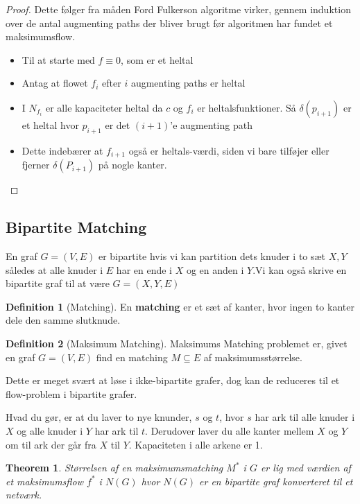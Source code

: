 \documentclass[11pt]{article}
\newtheorem{theorem}{Theorem}
\theoremstyle{definition}
\newtheorem{definition}{Definition}
\theoremstyle{remark}
\begin{document}
\begin{proof}
Dette følger fra måden Ford Fulkerson algoritme virker, gennem induktion over de antal augmenting paths der bliver brugt før algoritmen har fundet et maksimumsflow.

\begin{itemize}
\item Til at starte med $f \equiv 0$, som er et heltal
\item Antag at flowet $f_{i}$ efter $i$ augmenting paths er heltal
\item I $N_{f_{i}}$ er alle kapaciteter heltal da $c$ og $f_{i}$ er heltalsfunktioner. Så $\delta(p_{i+1})$ er et heltal hvor $p_{i+1}$ er det $(i+1)$'e augmenting path
\item Dette indebærer at $f_{i+1}$ også er heltals-værdi, siden vi bare tilføjer eller fjerner $\delta(P_{i+1})$ på nogle kanter.
\end{itemize}
\end{proof}

\subsection{Bipartite Matching}
\label{subsec:label}

En graf $G = (V,E)$ er bipartite hvis vi kan partition dets knuder i to sæt $X,Y$ således at alle knuder i $E$ har en ende i $X$ og en anden i $Y$.Vi kan også skrive en bipartite graf til at være $G = (X,Y,E)$

\begin{definition}[Matching]
En \textbf{matching} er et sæt af kanter, hvor ingen to kanter dele den samme slutknude.
\end{definition}

\begin{definition}[Maksimum Matching]

  Maksimums Matching problemet er, givet en graf $G = (V,E)$ find en matching $M \subseteq E$ af maksimumsstørrelse.
\end{definition}

Dette er meget svært at løse i ikke-bipartite grafer, dog kan de reduceres til et flow-problem i bipartite grafer.


Hvad du gør, er at du laver to nye knunder, $s$ og $t$, hvor $s$ har ark til alle knuder i $X$ og alle knuder i $Y$ har ark til $t$. Derudover laver du alle kanter mellem $X$ og $Y$ om til ark der går fra $X$ til $Y$. Kapaciteten i alle arkene er 1.

\begin{theorem}
Størrelsen af en maksimumsmatching $M^{*}$ i $G$ er lig med værdien af et maksimumsflow $f^{*}$ i $N(G)$ hvor $N(G)$ er en bipartite graf konverteret til et netværk.
\end{theorem}
\end{document}
